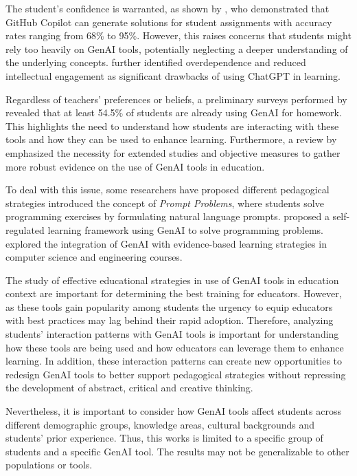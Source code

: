 \documentclass[a4paper,twoside]{article}
\begin{document}
The student's confidence is warranted, as shown by \cite{Puryear22}, who
demonstrated that GitHub Copilot can generate solutions for student assignments
with accuracy rates ranging from 68\% to 95\%. However, this raises concerns that
students might rely too heavily on GenAI tools, potentially neglecting a deeper
understanding of the underlying concepts. \cite{cai23} further identified
overdependence and reduced intellectual engagement as significant drawbacks of
using ChatGPT in learning.

Regardless of teachers' preferences or beliefs, a preliminary surveys performed
by \cite{Dickey24} revealed that at least 54.5\% of students are already using
GenAI for homework. This highlights the need to understand how students are
interacting with these tools and how they can be used to enhance learning.
Furthermore, a review by \cite{Lo24} emphasized the necessity for extended
studies and objective measures to gather more robust evidence on the use of
GenAI tools in education.


To deal with this issue, some researchers have proposed different pedagogical
strategies \cite{Denny24} introduced the concept of \textit{Prompt
Problems}, where students solve programming exercises by formulating natural
language prompts. \cite{Prasad24} proposed a self-regulated learning framework
using GenAI to solve programming problems. \cite{Lauren23} explored the
integration of GenAI with evidence-based learning strategies in computer science
and engineering courses.


The study of effective educational strategies in use of GenAI tools in education
context are important for determining the best training for educators. However,
as these tools gain popularity among students \cite{Dickey24} the urgency to
equip educators with best practices may lag behind their rapid adoption.
Therefore, analyzing students' interaction patterns with GenAI tools is
important for understanding how these tools are being used and how educators can
leverage them to enhance learning. In addition, these interaction patterns can
create new opportunities to redesign GenAI tools to better support pedagogical
strategies without repressing the development of abstract, critical and creative
thinking.


Nevertheless, it is important to consider how GenAI tools affect students across
different demographic groups, knowledge areas, cultural backgrounds
\cite{catalan21} \cite{neo22} and students' prior experience. Thus, this works
is limited to a specific group of students and a specific GenAI tool. The
results may not be generalizable to other populations or tools.
\end{document}
